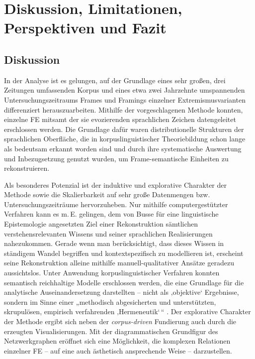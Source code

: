 \chapter{Diskussion, Limitationen, Perspektiven und Fazit}\label{diskussion-limitationen-perspektiven-und-fazit}

\section{Diskussion}\label{diskussion}

In der Analyse ist es gelungen, auf der Grundlage eines sehr großen, drei Zeitungen umfassenden Korpus und eines etwa zwei Jahrzehnte umspannenden Untersuchungszeitraums Frames und Framings einzelner Extremismusvarianten differenziert herauszuarbeiten. Mithilfe der vorgeschlagenen Methode konnten, einzelne FE mitsamt der sie evozierenden sprachlichen Zeichen datengeleitet erschlossen werden. Die Grundlage dafür waren distributionelle Strukturen der sprachlichen Oberfläche, die in korpuslinguistischer Theoriebildung schon lange als bedeutsam erkannt worden sind und durch ihre systematische Auswertung und Inbezugsetzung genutzt wurden, um Frame-semantische Einheiten zu rekonstruieren.

Als besonderes Potenzial ist der induktive und explorative Charakter der Methode sowie die Skalierbarkeit auf sehr große Datenmengen bzw. Untersuchungszeiträume hervorzuheben. Nur mithilfe computergestützter Verfahren kann es m.\,E. gelingen, dem von Busse für eine linguistische Epistemologie angesetzten Ziel einer Rekonstruktion sämtlichen verstehensrelevanten Wissens und seiner sprachlichen Realisierungen nahezukommen. Gerade wenn man berücksichtigt, dass dieses Wissen in ständigem Wandel begriffen und kontextspezifisch zu modellieren ist, erscheint seine Rekonstruktion alleine mithilfe manuell-qualitativer Ansätze geradezu aussichtslos. Unter Anwendung korpuslinguistischer Verfahren konnten semantisch reichhaltige Modelle erschlossen werden, die eine Grundlage für die analytische Auseinandersetzung darstellten -- nicht als ‚objektive` Ergebnisse, sondern im Sinne einer „methodisch abgesicherten und unterstützten, skrupulösen, empirisch verfahrenden ‚Hermeneutik`\,`` \autocite[156]{busseDiskursSpracheGesellschaftliches2013}. Der explorative Charakter der Methode ergibt sich neben der \emph{corpus-driven} Fundierung auch durch die erzeugten Visualisierungen. Mit der diagrammatischen Grundfigur des Netzwerkgraphen eröffnet sich eine Möglichkeit, die komplexen Relationen einzelner FE -- auf eine auch ästhetisch ansprechende Weise -- darzustellen.

